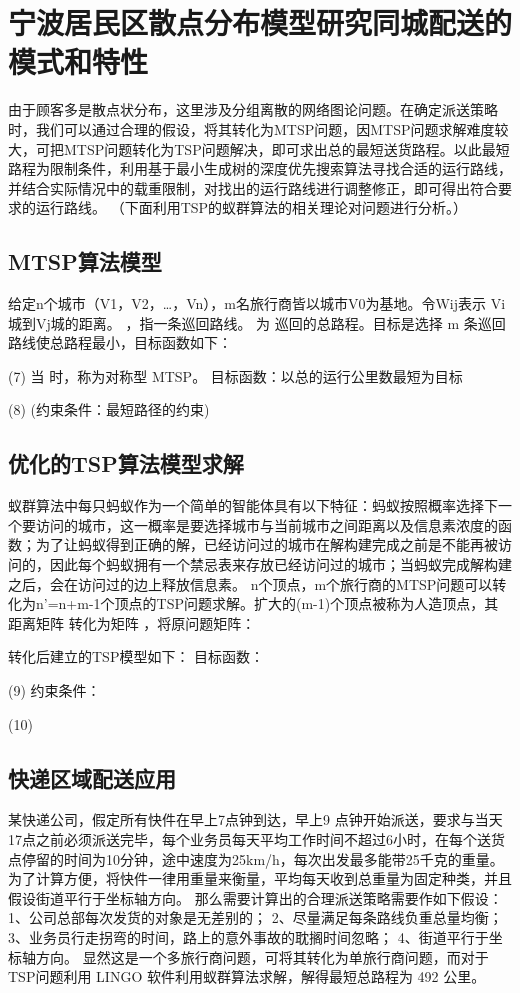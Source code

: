 \clearpage
\section{宁波居民区散点分布模型研究同城配送的模式和特性}
由于顾客多是散点状分布，这里涉及分组离散的网络图论问题。在确定派送策略时，我们可以通过合理的假设，将其转化为MTSP问题，因MTSP问题求解难度较大，可把MTSP问题转化为TSP问题解决，即可求出总的最短送货路程。以此最短路程为限制条件，利用基于最小生成树的深度优先搜索算法寻找合适的运行路线，并结合实际情况中的载重限制，对找出的运行路线进行调整修正，即可得出符合要求的运行路线。 
（下面利用TSP的蚁群算法的相关理论对问题进行分析。）

\subsection{MTSP算法模型}
给定n个城市（V1，V2，…，Vn），m名旅行商皆以城市V0为基地。令Wij表示 Vi城到Vj城的距离。
 ，指一条巡回路线。  为 巡回的总路程。目标是选择 m 条巡回路线使总路程最小，目标函数如下： 
 
(7)
当   时，称为对称型 MTSP。 
目标函数：以总的运行公里数最短为目标 
 
(8)
(约束条件：最短路径的约束)

\subsection{优化的TSP算法模型求解}
蚁群算法中每只蚂蚁作为一个简单的智能体具有以下特征：蚂蚁按照概率选择下一个要访问的城市，这一概率是要选择城市与当前城市之间距离以及信息素浓度的函数；为了让蚂蚁得到正确的解，已经访问过的城市在解构建完成之前是不能再被访问的，因此每个蚂蚁拥有一个禁忌表来存放已经访问过的城市；当蚂蚁完成解构建之后，会在访问过的边上释放信息素。
n个顶点，m个旅行商的MTSP问题可以转化为n'=n+m-1个顶点的TSP问题求解。扩大的(m-1)个顶点被称为人造顶点，其距离矩阵 转化为矩阵 ，将原问题矩阵：
 
转化后建立的TSP模型如下：
目标函数：
 
(9)
约束条件：
 
(10)

\subsection{快递区域配送应用}
某快递公司，假定所有快件在早上7点钟到达，早上9 点钟开始派送，要求与当天17点之前必须派送完毕，每个业务员每天平均工作时间不超过6小时，在每个送货点停留的时间为10分钟，途中速度为25km/h，每次出发最多能带25千克的重量。为了计算方便，将快件一律用重量来衡量，平均每天收到总重量为固定种类，并且假设街道平行于坐标轴方向。
那么需要计算出的合理派送策略需要作如下假设：
1、公司总部每次发货的对象是无差别的； 
2、尽量满足每条路线负重总量均衡； 
3、业务员行走拐弯的时间，路上的意外事故的耽搁时间忽略； 
4、街道平行于坐标轴方向。 
显然这是一个多旅行商问题，可将其转化为单旅行商问题，而对于 TSP问题利用 LINGO 软件利用蚁群算法求解，解得最短总路程为 492 公里。

